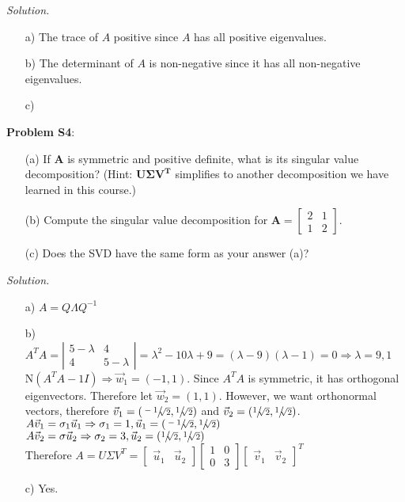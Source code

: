 \documentclass[12pt,pdftex]{article}
\begin{document}
\textit{Solution.}
\begin{itemize}
\item[a)] The trace of $A$ positive since $A$ has all positive eigenvalues.
\item[b)] The determinant of $A$ is non-negative since it has all non-negative eigenvalues.
\item[c)]
\end{itemize}

\noindent \textbf{Problem S4}:
\begin{itemize}
\item[(a)] If $\mathbf{A}$ is symmetric and positive definite, what is its 
singular value decomposition?  (Hint: $\mathbf{U\Sigma V^T}$ simplifies to 
another decomposition we have learned in this course.)
\item[(b)] Compute the singular value decomposition for $\mathbf{A}= 
\left[\begin{array}{cc} 2 &1\\ 1 & 2\end{array}\right]$.
\item[(c)] Does the SVD have the same form as your answer (a)? 
\end{itemize}

\textit{Solution.}
\begin{itemize}
\item[a)] $A=Q\Lambda Q^{-1}$
\item[b)] $A^TA=\left|\begin{matrix}5-\lambda & 4 \\ 4 & 5-\lambda\end{matrix}\right|=\lambda^2-10\lambda+9
			=(\lambda-9)(\lambda-1)=0\Rightarrow\lambda=9,1$\\
            N$(A^TA-1I)\Rightarrow\vec{w}_1=(-1,1)$. Since $A^TA$ is symmetric, it has orthogonal eigenvectors.
            Therefore let $\vec{w}_2=(1,1)$. However, we want orthonormal vectors, therefore
            $\vec{v}_1=(\sfrac{-1}{\sqrt[]{2}},\sfrac{1}{\sqrt[]{2}})$ 
            and $\vec{v}_2=(\sfrac{1}{\sqrt[]{2}},\sfrac{1}{\sqrt[]{2}})$.
            $A\vec{v}_1=\sigma_1\vec{u}_1\Rightarrow\sigma_1=1,\vec{u}_1=(\sfrac{-1}{\sqrt[]{2}},\sfrac{1}{\sqrt[]{2}})$\\
            $A\vec{v}_2=\sigma\vec{u}_2\Rightarrow\sigma_2=3,\vec{u}_2=(\sfrac{1}{\sqrt[]{2}},\sfrac{1}{\sqrt[]{2}})$\\
            Therefore $A=U\Sigma V^T=\begin{bmatrix}
            \vec{u}_1 & \vec{u}_2
            \end{bmatrix}\begin{bmatrix}
            1 & 0 \\ 0 & 3
            \end{bmatrix}\begin{bmatrix}
            \vec{v}_1 & \vec{v}_2
            \end{bmatrix}^T$
\item[c)] Yes.
\end{itemize}
\end{document}
